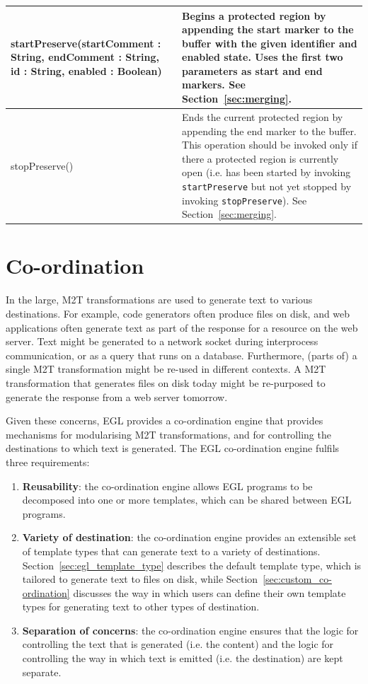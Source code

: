 \begin{longtabu} {|p{6.5cm}|X|}
			startPreserve(startComment : String, endComment : String, id : String, enabled : Boolean) & Begins a protected region by appending the start marker to the buffer with the given identifier and enabled state. Uses the first two parameters as start and end markers. See Section~\ref{sec:merging}. \\\hline
			
			stopPreserve() & Ends the current protected region by appending the end marker to the buffer. This operation should be invoked only if there a protected region is currently open (i.e. has been started by invoking \texttt{st\-a\-rtPr\-es\-er\-ve} but not yet stopped by invoking \texttt{st\-opPr\-es\-er\-ve}). See Section~\ref{sec:merging}. \\\hline
\end{longtabu}

\section{Co-ordination}
\label{Co-ordination}
In the large, M2T transformations are used to generate text to various destinations. For example, code generators often produce files on disk, and web applications often generate text as part of the response for a resource on the web server. Text might be generated to a network socket during interprocess communication, or as a query that runs on a database. Furthermore, (parts of) a single M2T transformation might be re-used in different contexts. A M2T transformation that generates files on disk today might be re-purposed to generate the response from a web server tomorrow.  

Given these concerns, EGL provides a co-ordination engine that provides mechanisms for modularising M2T transformations, and for controlling the destinations to which text is generated. The EGL co-ordination engine fulfils three requirements:

\begin{enumerate}
	\item \textbf{Reusability}: the co-ordination engine allows EGL programs to be decomposed into one or more templates, which can be shared between EGL programs.

	\item \textbf{Variety of destination}: the co-ordination engine provides an extensible set of template types that can generate text to a variety of destinations. Section~\ref{sec:egl_template_type} describes the default template type, which is tailored to generate text to files on disk, while Section~\ref{sec:custom_co-ordination} discusses the way in  which users can define their own template types for generating text to other types of destination.
	
	\item \textbf{Separation of concerns}: the co-ordination engine ensures that the logic for controlling the text that is generated (i.e. the content) and the logic for controlling the way in which text is emitted (i.e. the destination) are kept separate.
\end{enumerate}

